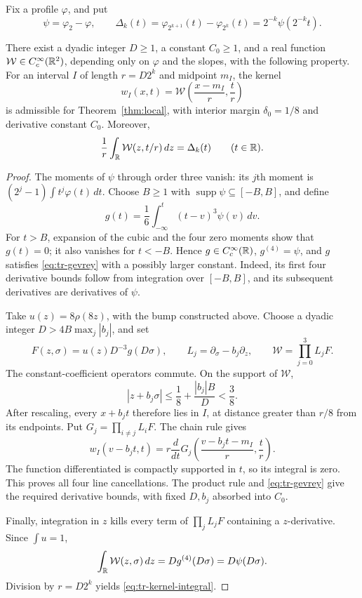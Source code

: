 Fix a profile \(\varphi\), and put
\begin{equation}
 \psi=\varphi_2-\varphi,
 \qquad
 \Delta_k(t)=\varphi_{2^{k+1}}(t)-\varphi_{2^k}(t)
            =2^{-k}\psi(2^{-k}t).
 \label{eq:tr-difference}
\end{equation}

\begin{lemma}
\label{lem:tr-kernel}
There exist a dyadic integer \(D\geq1\), a constant \(C_0\geq1\),
and a real function \(\mathcal W\in C_c^\infty(\mathbb R^2)\), depending
only on \(\varphi\) and the slopes, with the following property.
For an interval \(I\) of length \(r=D2^k\) and midpoint \(m_I\),
the kernel
\[
 w_I(x,t)=\mathcal W\left(\frac{x-m_I}{r},\frac{t}{r}\right)
\]
is admissible for Theorem~\ref{thm:local}, with interior margin
\(\delta_0=1/8\) and derivative constant \(C_0\).  Moreover,
\begin{equation}
 \frac1r\int_\mathbb R\mathcal W(z,t/r)\,dz=\Delta_k(t)
 \qquad(t\in\mathbb R).
 \label{eq:tr-kernel-integral}
\end{equation}
\end{lemma}

\begin{proof}
The moments of \(\psi\) through order three vanish: its \(j\)th
moment is \((2^j-1)\int t^j\varphi(t)\,dt\).  Choose \(B\geq1\)
with \(\operatorname{supp}\psi\subseteq[-B,B]\), and define
\[
 g(t)=\frac16\int_{-\infty}^t(t-v)^3\psi(v)\,dv.
\]
For \(t>B\), expansion of the cubic and the four zero moments show
that \(g(t)=0\); it also vanishes for \(t<-B\).  Hence
\(g\in C_c^\infty(\mathbb R)\), \(g^{(4)}=\psi\), and \(g\) satisfies
\eqref{eq:tr-gevrey} with a possibly larger constant.  Indeed, its
first four derivative bounds follow from integration over \([-B,B]\),
and its subsequent derivatives are derivatives of \(\psi\).

Take \(u(z)=8\rho(8z)\), with the bump constructed above.  Choose a
dyadic integer \(D>4B\max_j|b_j|\), and set
\[
 F(z,\sigma)=u(z)D^{-3}g(D\sigma),\qquad
 L_j=\partial_\sigma-b_j\partial_z,\qquad
 \mathcal W=\prod_{j=0}^3L_jF.
\]
The constant-coefficient operators commute.  On the support of
\(\mathcal W\),
\[
 |z+b_j\sigma|\leq\frac18+\frac{|b_j|B}{D}<\frac38.
\]
After rescaling, every \(x+b_jt\) therefore lies in \(I\), at distance
greater than \(r/8\) from its endpoints.  Put
\(G_j=\prod_{i\ne j}L_iF\).  The chain rule gives
\[
 w_I(v-b_jt,t)
 =r\frac{d}{dt}
   G_j\left(\frac{v-b_jt-m_I}{r},\frac{t}{r}\right).
\]
The function differentiated is compactly supported in \(t\), so its
integral is zero.  This proves all four line cancellations.  The product
rule and \eqref{eq:tr-gevrey} give the required derivative bounds,
with fixed \(D,b_j\) absorbed into \(C_0\).

Finally, integration in \(z\) kills every term of \(\prod_jL_jF\)
containing a \(z\)-derivative.  Since \(\int u=1\),
\[
 \int_\mathbb R\mathcal W(z,\sigma)\,dz=Dg^{(4)}(D\sigma)=D\psi(D\sigma).
\]
Division by \(r=D2^k\) yields \eqref{eq:tr-kernel-integral}.
\end{proof}

